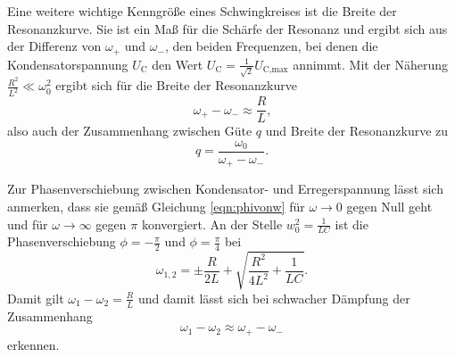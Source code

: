Eine weitere wichtige Kenngröße eines Schwingkreises ist die Breite der Resonanzkurve.
Sie ist ein Maß für die Schärfe der Resonanz und ergibt sich aus der Differenz von 
$\omega_+$ und $\omega_-$, den beiden Frequenzen, bei denen die Kondensatorspannung $U_{\text{C}}$ den Wert $U_{\text{C}} = \frac{1}{\sqrt{2}} U_{\text{C,max}}$ annimmt.
Mit der Näherung $\frac{R^2}{L^2} \ll \omega_0^2$ ergibt sich für die Breite der Resonanzkurve 
\begin{equation}
	\omega_+ - \omega_- \approx \frac{R}{L} \text{,}
\end{equation}
also auch der Zusammenhang zwischen Güte $q$ und Breite der Resonanzkurve zu
\begin{equation}
	q = \frac{\omega_0}{\omega_+ - \omega_-} \text{.}
\end{equation}

Zur Phasenverschiebung zwischen Kondensator- und Erregerspannung lässt sich anmerken, 
dass sie gemäß Gleichung \eqref{eqn:phivonw} für $\omega \to 0$ gegen Null geht und für 
$\omega \to \infty$ gegen $\pi$ konvergiert. 
An der Stelle $w_0^2 = \frac{1}{LC}$ ist die Phasenverschiebung $\phi = -\frac{\pi}{2}$ und 
$\phi = \frac{\pi}{4}$ bei
\begin{equation}
	\omega_{1,2} = \pm \frac{R}{2L} + \sqrt{\frac{R^2}{4L^2} + \frac{1}{LC}} \text{.}
\end{equation}
Damit gilt $\omega_1 - \omega_2 = \frac{R}{L}$ und damit lässt sich bei schwacher Dämpfung 
der Zusammenhang
\begin{equation}
	\omega_1 - \omega_2 \approx \omega_+ - \omega_-
\end{equation}
erkennen.
